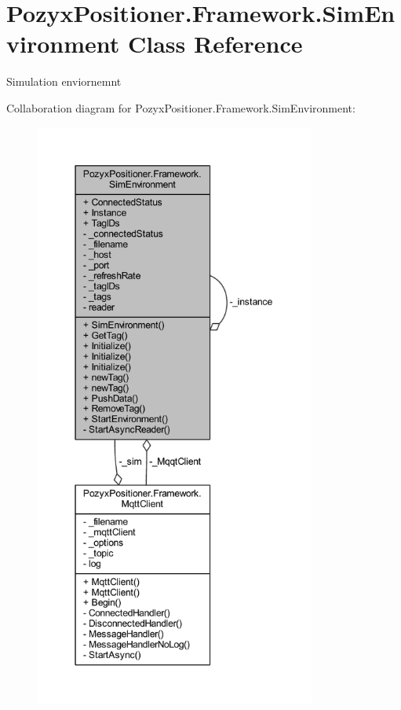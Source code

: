 \hypertarget{class_pozyx_positioner_1_1_framework_1_1_sim_environment}{}\section{Pozyx\+Positioner.\+Framework.\+Sim\+Environment Class Reference}
\label{class_pozyx_positioner_1_1_framework_1_1_sim_environment}


Simulation enviornemnt  




Collaboration diagram for Pozyx\+Positioner.\+Framework.\+Sim\+Environment\+:\nopagebreak
\begin{figure}[H]
\begin{center}
\leavevmode
\includegraphics[height=550pt]{class_pozyx_positioner_1_1_framework_1_1_sim_environment__coll__graph}
\end{center}
\end{figure}

